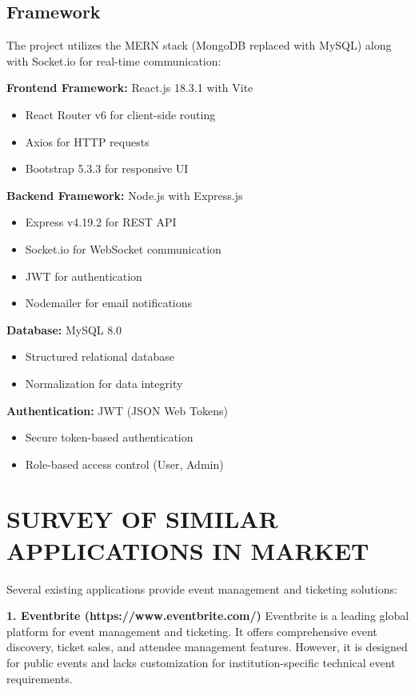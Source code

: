 \documentclass[12pt]{report}
\begin{document}
\section{Framework} 
The project utilizes the MERN stack (MongoDB replaced with MySQL) along with Socket.io for real-time communication:

\textbf{Frontend Framework:} React.js 18.3.1 with Vite
\begin{itemize}
\item React Router v6 for client-side routing
\item Axios for HTTP requests
\item Bootstrap 5.3.3 for responsive UI
\end{itemize}

\textbf{Backend Framework:} Node.js with Express.js
\begin{itemize}
\item Express v4.19.2 for REST API
\item Socket.io for WebSocket communication
\item JWT for authentication
\item Nodemailer for email notifications
\end{itemize}

\textbf{Database:} MySQL 8.0
\begin{itemize}
\item Structured relational database
\item Normalization for data integrity
\end{itemize}

\textbf{Authentication:} JWT (JSON Web Tokens)
\begin{itemize}
\item Secure token-based authentication
\item Role-based access control (User, Admin)
\end{itemize}

\chapter{SURVEY OF SIMILAR APPLICATIONS IN MARKET} 
\linespread{1.5}

Several existing applications provide event management and ticketing solutions:

\textbf{1. Eventbrite (https://www.eventbrite.com/)}
Eventbrite is a leading global platform for event management and ticketing. It offers comprehensive event discovery, ticket sales, and attendee management features. However, it is designed for public events and lacks customization for institution-specific technical event requirements.
\end{document}
